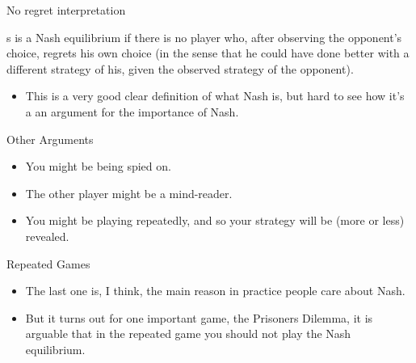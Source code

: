 \documentclass[
  14pt,
  letterpaper,
  ignorenonframetext,
  aspectratio=169,
]{beamer}
\providecommand{\tightlist}{%
  \setlength{\itemsep}{0pt}\setlength{\parskip}{0pt}}\usepackage{longtable,booktabs,array}
\renewenvironment*{quote}	
	{\list{}{\rightmargin   \leftmargin} \item } 	
	{\endlist }
\let\olditem\item
\renewcommand{\item}{%
\olditem\vspace{6pt}}
\begin{document}
\begin{frame}{No regret interpretation}
\protect\hypertarget{no-regret-interpretation}{}
\begin{quote}
s is a Nash equilibrium if there is no player who, after observing the
opponent's choice, regrets his own choice (in the sense that he could
have done better with a different strategy of his, given the observed
strategy of the opponent).
\end{quote}

\begin{itemize}[<+->]
\tightlist
\item
  This is a very good clear definition of what Nash is, but hard to see
  how it's a an argument for the importance of Nash.
\end{itemize}
\end{frame}

\begin{frame}{Other Arguments}
\protect\hypertarget{other-arguments}{}
\begin{itemize}[<+->]
\tightlist
\item
  You might be being spied on.
\item
  The other player might be a mind-reader.
\item
  You might be playing repeatedly, and so your strategy will be (more or
  less) revealed.
\end{itemize}
\end{frame}

\begin{frame}{Repeated Games}
\protect\hypertarget{repeated-games}{}
\begin{itemize}[<+->]
\tightlist
\item
  The last one is, I think, the main reason in practice people care
  about Nash.
\item
  But it turns out for one important game, the Prisoners Dilemma, it is
  arguable that in the repeated game you should not play the Nash
  equilibrium.
\end{itemize}
\end{frame}
\end{document}
